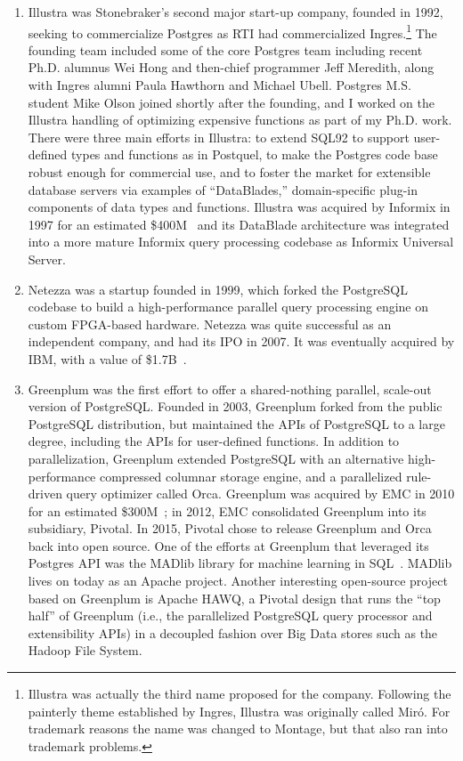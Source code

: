 \documentclass[sigconf,natbib=false]{acmart}
\begin{document}
\begin{enumerate}[1. ]

\item Illustra was Stonebraker's second major start-up company, founded in 1992, seeking to commercialize Postgres as RTI had commercialized Ingres.\footnote{Illustra was actually the third name proposed for the company. Following the painterly theme established by Ingres, Illustra was originally called Mir\'{o}. For trademark reasons the name was changed to Montage, but that also ran into trademark problems.} The founding team included some of the core Postgres team including recent Ph.D. alumnus Wei Hong and then-chief programmer Jeff Meredith, along with Ingres alumni Paula Hawthorn and Michael Ubell. Postgres M.S. student Mike Olson joined shortly after the founding, and I worked on the Illustra handling of optimizing expensive functions as part of my Ph.D. work. There were three main efforts in Illustra: to extend SQL92 to support user-defined types and functions as in Postquel, to make the Postgres code base robust enough for commercial use, and to foster the market for extensible database servers via examples of ``DataBlades,'' domain-specific plug-in components of data types and functions. Illustra was acquired by Informix in 1997 for an estimated \$400M~\cite{illustra} and its DataBlade architecture was integrated into a more mature Informix query processing codebase as Informix Universal Server.

\item Netezza was a startup founded in 1999, which forked the PostgreSQL codebase to build a high-performance parallel query processing engine on custom FPGA-based hardware. Netezza was quite successful as an independent company, and had its IPO in 2007. It was eventually acquired by IBM, with a value of \$1.7B~\cite{netezza}.

\item Greenplum was the first effort to offer a shared-nothing parallel, scale-out version of PostgreSQL. Founded in 2003, Greenplum forked from the public PostgreSQL distribution, but maintained the APIs of PostgreSQL to a large degree, including the APIs for user-defined functions. In addition to parallelization, Greenplum extended PostgreSQL with an alternative high-performance compressed columnar storage engine, and a parallelized rule-driven query optimizer called Orca. Greenplum was acquired by EMC in 2010 for an estimated \$300M~\cite{greenplum}; in 2012, EMC consolidated Greenplum into its subsidiary, Pivotal. In 2015, Pivotal chose to release Greenplum and Orca back into open source. One of the efforts at Greenplum that leveraged its Postgres API was the MADlib library for machine learning in SQL~\cite{hellerstein2012madlib}. MADlib lives on today as an Apache project. Another interesting open-source project based on Greenplum is Apache HAWQ, a Pivotal design that runs the ``top half'' of Greenplum (i.e., the parallelized PostgreSQL query processor and extensibility APIs) in a decoupled fashion over Big Data stores such as the Hadoop File System.


\end{enumerate}
\end{document}
